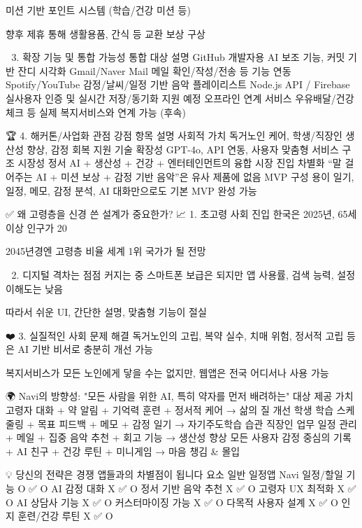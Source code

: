 미션 기반 포인트 시스템 (학습/건강 미션 등)

향후 제휴 통해 생활용품, 간식 등 교환 보상 구상

🔗 3. 확장 기능 및 통합 가능성
통합 대상	설명
GitHub	개발자용 AI 보조 기능, 커밋 기반 잔디 시각화
Gmail/Naver Mail	메일 확인/작성/전송 등 기능 연동
Spotify/YouTube	감정/날씨/일정 기반 음악 플레이리스트
Node.js API / Firebase	실사용자 인증 및 실시간 저장/동기화 지원 예정
오프라인 연계 서비스	우유배달/건강체크 등 실제 복지서비스와 연계 가능 (후속)

🏆 4. 해커톤/사업화 관점 강점
항목	설명
사회적 가치	독거노인 케어, 학생/직장인 생산성 향상, 감정 회복 지원
기술 확장성	GPT-4o, API 연동, 사용자 맞춤형 서비스 구조
시장성	정서 AI + 생산성 + 건강 + 엔터테인먼트의 융합 시장 진입
차별화	“말 걸어주는 AI + 미션 보상 + 감정 기반 음악”은 유사 제품에 없음
MVP 구성 용이	일기, 일정, 메모, 감정 분석, AI 대화만으로도 기본 MVP 완성 가능










✅ 왜 고령층을 신경 쓴 설계가 중요한가?
📈 1. 초고령 사회 진입
한국은 2025년, 65세 이상 인구가 20%

2045년경엔 고령층 비율 세계 1위 국가가 될 전망

🧓 2. 디지털 격차는 점점 커지는 중
스마트폰 보급은 되지만 앱 사용률, 검색 능력, 설정 이해도는 낮음

따라서 쉬운 UI, 간단한 설명, 맞춤형 기능이 절실

❤️ 3. 실질적인 사회 문제 해결
독거노인의 고립, 복약 실수, 치매 위험, 정서적 고립 등은 AI 기반 비서로 충분히 개선 가능

복지서비스가 모든 노인에게 닿을 수는 없지만, 웹앱은 전국 어디서나 사용 가능

🌍 Navi의 방향성: "모든 사람을 위한 AI, 특히 약자를 먼저 배려하는"
대상	제공 가치
고령자	대화 + 약 알림 + 기억력 훈련 + 정서적 케어 → 삶의 질 개선
학생	학습 스케줄링 + 목표 피드백 + 메모 + 감정 일기 → 자기주도학습 습관
직장인	업무 일정 관리 + 메일 + 집중 음악 추천 + 회고 기능 → 생산성 향상
모든 사용자	감정 중심의 기록 + AI 친구 + 건강 루틴 + 미니게임 → 마음 챙김 & 몰입

💡 당신의 전략은 경쟁 앱들과의 차별점이 됩니다
요소	일반 일정앱	Navi
일정/할일 기능	O	✅ O
AI 감정 대화	X	✅ O
정서 기반 음악 추천	X	✅ O
고령자 UX 최적화	X	✅ O
AI 상담사 기능	X	✅ O
커스터마이징 가능	X	✅ O
다목적 사용자 설계	X	✅ O
인지 훈련/건강 루틴	X	✅ O









